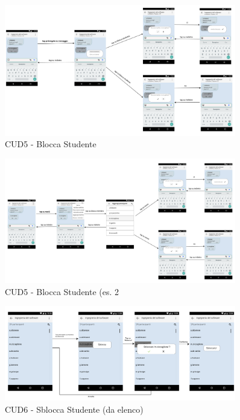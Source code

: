 \begin{figure}
	\centering
	\includegraphics[width=0.9\textwidth]{imgs/gruppo6/activities/act_cud5_blocca_studente.pdf}
	\caption{CUD5 - Blocca Studente}
	\label{fig:cud5}
\end{figure}

\begin{figure}
	\centering
	\includegraphics[width=0.9\textwidth]{imgs/gruppo6/activities/act_cud5_blocca_studente2.pdf}
	\caption{CUD5 - Blocca Studente (es. 2}
	\label{fig:cud5-2}
\end{figure}

\begin{figure}
	\centering
	\includegraphics[width=0.9\textwidth]{imgs/gruppo6/activities/act_cud6_sblocca_da_elenco.pdf}
	\caption{CUD6 - Sblocca Studente (da elenco)}
	\label{fig:cud6}
\end{figure}

